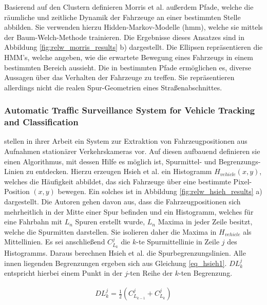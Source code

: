 Basierend auf den Clustern definieren Morris et al. außerdem Pfade, welche die räumliche und zeitliche Dynamik
der Fahrzeuge an einer bestimmten Stelle abbilden. Sie verwenden hierzu Hidden-Markov-Modelle (\acrshort*{hmm}),
welche sie mittels der Baum-Welch-Methode trainieren.
Die Ergebnisse dieses Ansatzes sind in Abbildung \ref{fig:relw_morris_results} b) dargestellt. Die
Ellipsen repräsentieren die HMM's, welche angeben, wie die erwartete Bewegung eines Fahrzeugs in einem
bestimmten Bereich aussieht.
Die in \cite[]{Morris2011} bestimmten Pfade ermöglichen es, diverse Aussagen über das Verhalten der Fahrzeuge
zu treffen. Sie repräsentieren allerdings nicht die realen Spur-Geometrien eines Straßenabschnittes.

\subsubsection*{Automatic Traffic Surveillance System for Vehicle Tracking and Classification}

\cite[]{Hsieh2006} stellen in ihrer Arbeit ein System zur Extraktion von Fahrzeugpositionen aus Aufnahmen
stationärer Verkehrskameras vor. Auf diesen aufbauend definieren sie einen Algorithmus, mit dessen Hilfe es
möglich ist, Spurmittel- und Begrenzungs-Linien zu entdecken.
Hierzu erzeugen Hsieh et al. ein Histogramm $H_{vehicle}(x,y)$, welches die Häufigkeit abbildet, das sich Fahrzeuge über eine
bestimmte Pixel-Position $(x, y)$ bewegen. Ein solches ist in Abbildung \ref{fig:relw_hsieh_results} a) dargestellt.
Die Autoren gehen davon aus, dass die Fahrzeugpositionen sich mehrheitlich in der Mitte einer Spur befinden und
ein Histogramm, welches für eine Fahrbahn mit $L_n$ Spuren erstellt wurde, $L_n$ Maxima in jeder Zeile besitzt,
welche die Spurmitten darstellen.
Sie isolieren daher die Maxima in $H_{vehicle}$ als Mittellinien. Es sei anschließend $C_{L_k}^{j}$ die $k$-te Spurmittellinie
in Zeile $j$ des Histogramms. Daraus berechnen Hsieh et al. die Spurbegrenzungslinien. Alle innen liegenden
Begrenzungen ergeben sich aus Gleichung \ref{eq_hsieh1}. $DL_{k}^{j}$ entspricht hierbei einem Punkt
in der $j$-ten Reihe der $k$-ten Begrenzung.

\begin{ceqn}
\begin{align}
\label{eq_hsieh1}
    DL_{k}^{j} = \frac{1}{2} (C_{L_{k-1}}^{j} + C_{L_{k}}^{j})
\end{align}
\end{ceqn}

